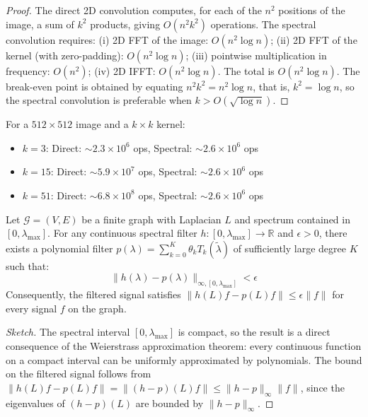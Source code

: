 \begin{proof}
The direct 2D convolution computes, for each of the $n^2$ positions of the image, a sum of $k^2$ products, giving $O(n^2 k^2)$ operations. The spectral convolution requires: (i) 2D FFT of the image: $O(n^2 \log n)$; (ii) 2D FFT of the kernel (with zero-padding): $O(n^2 \log n)$; (iii) pointwise multiplication in frequency: $O(n^2)$; (iv) 2D IFFT: $O(n^2 \log n)$. The total is $O(n^2 \log n)$. The break-even point is obtained by equating $n^2 k^2 = n^2 \log n$, that is, $k^2 = \log n$, so the spectral convolution is preferable when $k > O(\sqrt{\log n})$.
\end{proof}

\begin{example}\label{ex:eficiencia_practica}
For a $512 \times 512$ image and a $k \times k$ kernel:
\begin{itemize}
    \item $k = 3$: Direct: $\sim 2.3 \times 10^6$ ops, Spectral: $\sim 2.6 \times 10^6$ ops
    \item $k = 15$: Direct: $\sim 5.9 \times 10^7$ ops, Spectral: $\sim 2.6 \times 10^6$ ops
    \item $k = 51$: Direct: $\sim 6.8 \times 10^8$ ops, Spectral: $\sim 2.6 \times 10^6$ ops
\end{itemize}
\end{example}

\begin{theorem}\label{thm:aproximacion_universal_espectral}
Let $\mathcal{G} = (V, E)$ be a finite graph with Laplacian $L$ and spectrum contained in $[0, \lambda_{\max}]$. For any continuous spectral filter $h: [0, \lambda_{\max}] \to \mathbb{R}$ and $\epsilon > 0$, there exists a polynomial filter $p(\lambda) = \sum_{k=0}^{K} \theta_k T_k(\tilde{\lambda})$ of sufficiently large degree $K$ such that:
\begin{equation}
\|h(\lambda) - p(\lambda)\|_{\infty, [0, \lambda_{\max}]} < \epsilon
\end{equation}
Consequently, the filtered signal satisfies $\|h(L)f - p(L)f\| \leq \epsilon \|f\|$ for every signal $f$ on the graph.
\end{theorem}

\begin{proof}[Sketch]
The spectral interval $[0, \lambda_{\max}]$ is compact, so the result is a direct consequence of the Weierstrass approximation theorem: every continuous function on a compact interval can be uniformly approximated by polynomials. The bound on the filtered signal follows from $\|h(L)f - p(L)f\| = \|(h-p)(L)f\| \leq \|h - p\|_\infty \|f\|$, since the eigenvalues of $(h-p)(L)$ are bounded by $\|h-p\|_\infty$.
\end{proof}

